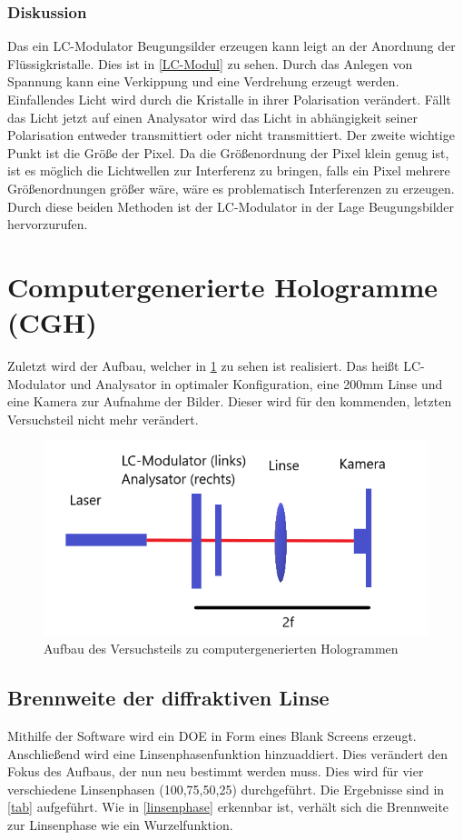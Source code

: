 \subsubsection{Diskussion}
Das ein LC-Modulator Beugungsilder erzeugen kann leigt an der Anordnung der Flüssigkristalle. Dies ist in \cref{LC-Modul} zu sehen. Durch das Anlegen von Spannung kann eine Verkippung und eine Verdrehung erzeugt werden. Einfallendes Licht wird durch die Kristalle in ihrer Polarisation verändert. Fällt das Licht jetzt auf einen Analysator wird das Licht in abhängigkeit seiner Polarisation entweder transmittiert oder nicht transmittiert.
Der zweite wichtige Punkt ist die Größe der Pixel. Da die Größenordnung der Pixel klein genug ist, ist es möglich die Lichtwellen zur Interferenz zu bringen, falls ein Pixel mehrere Größenordnungen größer wäre, wäre es problematisch Interferenzen zu erzeugen.
Durch diese beiden Methoden ist der LC-Modulator in der Lage Beugungsbilder hervorzurufen.

\section{Computergenerierte Hologramme (CGH)}
Zuletzt wird der Aufbau, welcher in \cref{cghskizze} zu sehen ist realisiert. Das heißt LC-Modulator und Analysator in optimaler Konfiguration, eine 200mm Linse und eine Kamera zur Aufnahme der Bilder. Dieser wird für den kommenden, letzten Versuchsteil nicht mehr verändert.

\begin{figure}
	\centering
	\includegraphics[scale=1]{4.1.2-Aufbau2.png}
	\caption{Aufbau des Versuchsteils zu computergenerierten Hologrammen}
	\label{cghskizze}
\end{figure}

\subsection{Brennweite der diffraktiven Linse}
Mithilfe der Software wird ein DOE in Form eines Blank Screens erzeugt. Anschließend wird eine Linsenphasenfunktion hinzuaddiert. Dies verändert den Fokus des Aufbaus, der nun neu bestimmt werden muss. Dies wird für vier verschiedene Linsenphasen (100,75,50,25) durchgeführt. Die Ergebnisse sind in \cref{tab} aufgeführt. Wie in \cref{linsenphase} erkennbar ist, verhält sich die Brennweite zur Linsenphase wie ein Wurzelfunktion.

